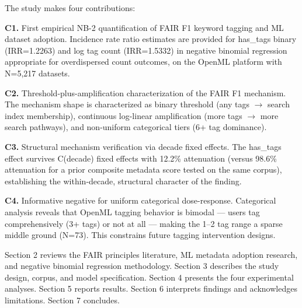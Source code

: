 The study makes four contributions:

\textbf{C1.} First empirical NB-2 quantification of FAIR F1 keyword tagging and ML dataset adoption. Incidence rate ratio estimates are provided for has\_tags binary (IRR=1.2263) and log tag count (IRR=1.5332) in negative binomial regression appropriate for overdispersed count outcomes, on the OpenML platform with N=5,217 datasets.

\textbf{C2.} Threshold-plus-amplification characterization of the FAIR F1 mechanism. The mechanism shape is characterized as binary threshold (any tags $\rightarrow$ search index membership), continuous log-linear amplification (more tags $\rightarrow$ more search pathways), and non-uniform categorical tiers (6+ tag dominance).

\textbf{C3.} Structural mechanism verification via decade fixed effects. The has\_tags effect survives C(decade) fixed effects with 12.2\% attenuation (versus 98.6\% attenuation for a prior composite metadata score tested on the same corpus), establishing the within-decade, structural character of the finding.

\textbf{C4.} Informative negative for uniform categorical dose-response. Categorical analysis reveals that OpenML tagging behavior is bimodal --- users tag comprehensively (3+ tags) or not at all --- making the 1--2 tag range a sparse middle ground (N=73). This constrains future tagging intervention designs.

Section 2 reviews the FAIR principles literature, ML metadata adoption research, and negative binomial regression methodology. Section 3 describes the study design, corpus, and model specification. Section 4 presents the four experimental analyses. Section 5 reports results. Section 6 interprets findings and acknowledges limitations. Section 7 concludes.

